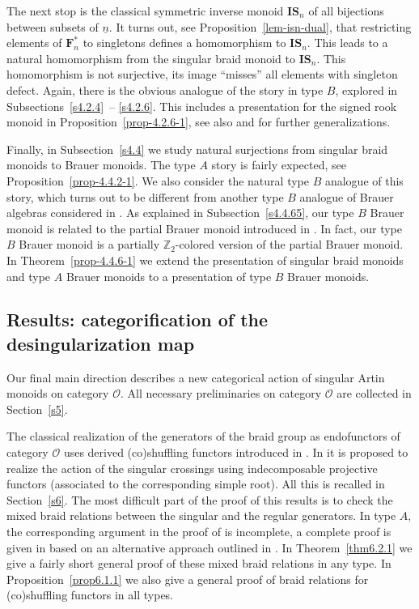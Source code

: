 \documentclass[a4paper]{amsart}
\begin{document}
The next stop is the classical symmetric inverse monoid 
$\mathbf{IS}_n$ of all bijections between subsets of $\underline{n}$. 
It turns out, see Proposition~\ref{lem-isn-dual}, that restricting elements of 
$\mathbf{F}^*_n$ to singletons defines a homomorphism to $\mathbf{IS}_n$.
This leads to a natural homomorphism from the singular braid 
monoid to $\mathbf{IS}_n$. This homomorphism is not surjective,
its image ``misses'' all elements with singleton defect.
Again, there is the obvious analogue of the story in type $B$,
explored in Subsections~\ref{s4.2.4}~-- \ref{s4.2.6}.
This includes a presentation for the signed rook monoid
in Proposition~\ref{prop-4.2.6-1}, see also \cite{EF13} and \cite{CE}
for further generalizations.

Finally, in Subsection~\ref{s4.4} we study natural surjections from singular
braid monoids to Brauer monoids. The type $A$ story is fairly
expected, see Proposition~\ref{prop-4.4.2-1}. We also consider
the natural type $B$ analogue of this story, which turns out to be
different from another type $B$ analogue of Brauer algebras considered
in \cite{CL}. As explained in Subsection~\ref{s4.4.65}, our type $B$ 
Brauer monoid is related to the partial Brauer monoid introduced in \cite{Ma98}.
In fact, our type $B$ Brauer monoid is a partially $\mathbb{Z}_2$-colored version
of the partial Brauer monoid. In Theorem~\ref{prop-4.4.6-1} we extend
the presentation of singular braid monoids and type $A$ Brauer monoids to
a presentation of type $B$ Brauer monoids.

\subsection{Results: categorification of the desingularization map}\label{s1.5}

Our final main direction describes a new categorical action of 
singular Artin monoids on category $\mathcal{O}$. All necessary preliminaries 
on category $\mathcal{O}$ are collected in Section~\ref{s5}.

The classical realization of the generators of the braid group as
endofunctors of category $\mathcal{O}$ uses derived (co)shuffling
functors introduced in \cite{Ca}. In \cite[Theorem~1]{MaStr2} it is
proposed to realize the action of the singular crossings using
indecomposable projective functors (associated to the corresponding
simple root). All this is recalled in Section~\ref{s6}.
The most difficult part of the proof of this results is to check
the mixed braid relations between the singular and the regular
generators. In type $A$, the corresponding argument in 
the proof of \cite[Theorem~1]{MaStr2} is incomplete, a complete
proof is given in \cite[Theorem~5.1]{CM} based on an alternative
approach outlined in \cite{MaStr2}. In Theorem~\ref{thm6.2.1} we
give a fairly short general proof of these mixed braid relations
in any type. In Proposition~\ref{prop6.1.1} we also give a general
proof of braid relations for (co)shuffling functors in all types.
\end{document}
